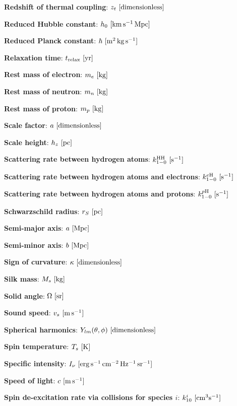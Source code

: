 \documentclass[a4paper,11pt]{article}
\begin{document}
{\noindent}\textbf{Redshift of thermal coupling}: $z_t ~ [{\rm dimensionless}]$

{\noindent}\textbf{Reduced Hubble constant}: $h_0 ~ [{\rm km\,s^{-1}\,Mpc}]$

{\noindent}\textbf{Reduced Planck constant}: $\hbar ~ [{\rm m^2\,kg\,s^{-1}}]$

{\noindent}\textbf{Relaxation time}: $t_\mathrm{relax} ~ [{\rm yr}]$

{\noindent}\textbf{Rest mass of electron}: $m_e ~ [{\rm kg}]$

{\noindent}\textbf{Rest mass of neutron}: $m_n ~ [{\rm kg}]$

{\noindent}\textbf{Rest mass of proton}: $m_p ~ [{\rm kg}]$

{\noindent}\textbf{Scale factor}: $a ~ [{\rm dimensionless}]$

{\noindent}\textbf{Scale height}: $h_z ~ [{\rm pc}]$

{\noindent}\textbf{Scattering rate between hydrogen atoms}: $k_{1-0}^\mathrm{HH} ~ [{\rm s^{-1}}]$

{\noindent}\textbf{Scattering rate between hydrogen atoms and electrons}: $k_{1-0}^{e\mathrm{H}} ~ [{\rm s^{-1}}]$

{\noindent}\textbf{Scattering rate between hydrogen atoms and protons}: $k_{1-0}^{p\mathrm{H}} ~ [{\rm s^{-1}}]$

{\noindent}\textbf{Schwarzschild radius}: $r_S ~ [{\rm pc}]$

{\noindent}\textbf{Semi-major axis}: $a ~ [{\rm Mpc}]$

{\noindent}\textbf{Semi-minor axis}: $b ~ [{\rm Mpc}]$

{\noindent}\textbf{Sign of curvature}: $\kappa ~ [{\rm dimensionless}]$

{\noindent}\textbf{Silk mass}: $M_s ~ [{\rm kg}]$

{\noindent}\textbf{Solid angle}: $\Omega ~ [{\rm sr}]$

{\noindent}\textbf{Sound speed}: $v_s ~ [{\rm m\,s^{-1}}]$

{\noindent}\textbf{Spherical harmonics}: $Y_{lm}(\theta,\phi) ~ [{\rm dimensionless}]$

{\noindent}\textbf{Spin temperature}: $T_s ~ [{\rm K}]$

{\noindent}\textbf{Specific intensity}: $I_\nu ~ [{\rm erg\,s^{-1}\,cm^{-2}\,Hz^{-1}\,sr^{-1}}]$

{\noindent}\textbf{Speed of light}: $c ~ [{\rm m\,s^{-1}}]$

{\noindent}\textbf{Spin de-excitation rate via collisions for species $i$}: $k_{10}^i ~ [{\rm cm^3s^{-1}}]$
\end{document}
